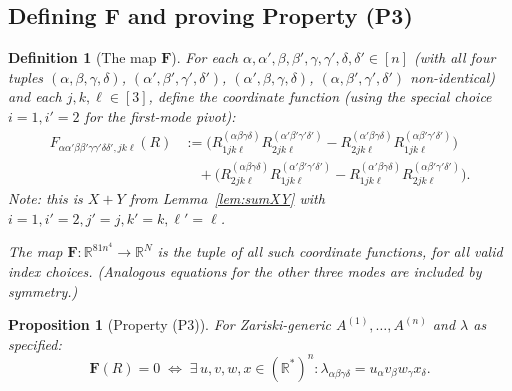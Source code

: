 \documentclass[12pt]{article}
\newtheorem{proposition}[theorem]{Proposition}
\newtheorem{definition}[theorem]{Definition}
\newcommand{\R}{\mathbb{R}}
\begin{document}
\subsection{Defining \texorpdfstring{$\mathbf{F}$}{F} and proving Property (P3)}

\begin{definition}[The map $\mathbf{F}$]\label{def:F}
For each $\alpha,\alpha',\beta,\beta',\gamma,\gamma',\delta,\delta'\in[n]$ (with all four tuples
$(\alpha,\beta,\gamma,\delta)$, $(\alpha',\beta',\gamma',\delta')$, $(\alpha',\beta,\gamma,\delta)$,
$(\alpha,\beta',\gamma',\delta')$ non-identical) and each $j,k,\ell\in[3]$, define the coordinate
function (using the special choice $i=1,i'=2$ for the first-mode pivot):
\begin{align}
  F_{\alpha\alpha'\beta\beta'\gamma\gamma'\delta\delta',jk\ell}(R)
  &:=
  \bigl(R^{(\alpha\beta\gamma\delta)}_{1jk\ell}R^{(\alpha'\beta'\gamma'\delta')}_{2jk\ell}
  - R^{(\alpha'\beta\gamma\delta)}_{2jk\ell}R^{(\alpha\beta'\gamma'\delta')}_{1jk\ell}\bigr)
  \nonumber\\
  &\quad+
  \bigl(R^{(\alpha\beta\gamma\delta)}_{2jk\ell}R^{(\alpha'\beta'\gamma'\delta')}_{1jk\ell}
  - R^{(\alpha'\beta\gamma\delta)}_{1jk\ell}R^{(\alpha\beta'\gamma'\delta')}_{2jk\ell}\bigr).
  \label{eq:Fcoord}
\end{align}
Note: this is $X+Y$ from Lemma~\ref{lem:sumXY} with $i=1,i'=2,j'=j,k'=k,\ell'=\ell$.

The map $\mathbf{F}:\R^{81n^4}\to\R^N$ is the tuple of all such coordinate functions, for all
valid index choices.  (Analogous equations for the other three modes are included by symmetry.)
\end{definition}

\begin{proposition}[Property (P3)]\label{prop:P3}
For Zariski-generic $A^{(1)},\dots,A^{(n)}$ and $\lambda$ as specified:
\[
  \mathbf{F}(R) = 0
  \;\Longleftrightarrow\;
  \exists\,u,v,w,x\in(\R^*)^n:\lambda_{\alpha\beta\gamma\delta}=u_\alpha v_\beta w_\gamma x_\delta.
\]
\end{proposition}
\end{document}
